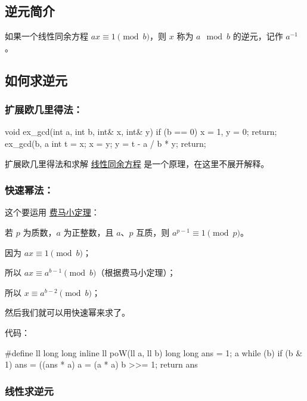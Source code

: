 
\subsection{逆元简介}

如果一个线性同余方程 $ax \equiv 1 \pmod b$，则 $x$ 称为 $a \mod b$ 的逆元，记作 $a^{-1}$。

\subsection{如何求逆元}

\subsubsection{扩展欧几里得法：}

\begin{cppcode}
void ex_gcd(int a, int b, int& x, int& y) {
  if (b == 0) {
    x = 1, y = 0;
    return;
  }
  ex_gcd(b, a %
  int t = x;
  x = y;
  y = t - a / b * y;
  return;
}
\end{cppcode}

扩展欧几里得法和求解 \href{/math/linear-equation/}{线性同余方程} 是一个原理，在这里不展开解释。

\subsubsection{快速幂法：}

这个要运用 \href{/math/fermat/}{费马小定理}：

\begin{QUOTE}{}{}
若 $p$ 为质数，$a$ 为正整数，且 $a$、$p$ 互质，则 $a^{p-1} \equiv 1 \pmod p$。
\end{QUOTE}

因为 $ax \equiv 1 \pmod b$；

所以 $ax \equiv a^{b-1} \pmod b$（根据费马小定理）；

所以 $x \equiv a^{b-2} \pmod b$；

然后我们就可以用快速幂来求了。

代码：

\begin{cppcode}
#define ll long long
inline ll poW(ll a, ll b) {
  long long ans = 1;
  a %
  while (b) {
    if (b & 1) ans = ((ans * a) %
    a = (a * a) %
    b >>= 1;
  }
  return ans %
}
\end{cppcode}

\subsubsection{线性求逆元}

